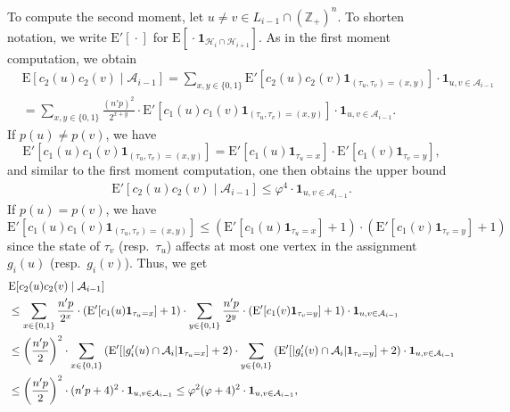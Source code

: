 \documentclass[11pt]{article}
\newcommand{\Z}{\mathbb{Z}}
\newcommand{\A}{\mathcal{A}}
\DeclarePairedDelimiter{\abs}{\lvert}{\rvert}
\theoremstyle{remark}
\begin{document}
    To compute the second moment, let $u\neq v \in L_{i-1} \cap (\Z_+)^n$. To shorten notation, we write $\mathrm E'[\ \boldsymbol{\cdot}\ ]$ for  $\mathrm E[\ \boldsymbol{\cdot}\ \mathbf{1}_{\mathcal{H}_i \cap \mathcal{H}_{i+1}} ]$.  As in the first moment computation, we obtain
    \begin{align}
        &\mathrm E[c_2(u) c_2(v) \mid \A_{i-1}] = \sum_{x,y\in \{0,1\}} \mathrm E'[c_2(u) c_2(v) \mathbf{1}_{(\tau_u,\tau_v)=(x,y)}  ] \cdot  \mathbf{1}_{u,v \in \A_{i-1}} \\
        &=  \sum_{x,y\in \{0,1\}} \frac{(n'p)^2}{2^{x+y}}\cdot \mathrm E'[c_1(u) c_1(v) \mathbf{1}_{(\tau_u,\tau_v)=(x,y)}   ] \cdot  \mathbf{1}_{u,v \in \A_{i-1}}.
    \end{align}
    If $p(u) \neq p(v)$, we have
    \begin{equation}
        \mathrm E'[c_1(u) c_1(v) \mathbf{1}_{(\tau_u,\tau_v)=(x,y)}] =  \mathrm E'[c_1(u) \mathbf{1}_{\tau_u=x}] \cdot \mathrm E'[c_1(v) \mathbf{1}_{\tau_v=y}],
    \end{equation}
    and similar to the first moment computation, one then obtains the upper bound  
    \begin{align}
        \mathrm E'[c_2(u) c_2(v) \mid \A_{i-1}] \le \varphi^4 \cdot  \mathbf{1}_{u,v \in \A_{i-1}}.
    \end{align}
    If $p(u) = p(v)$, we have 
    \begin{equation}
        \mathrm E'[c_1(u) c_1(v) \mathbf{1}_{(\tau_u,\tau_v)=(x,y)}] \le  (\mathrm E'[c_1(u) \mathbf{1}_{\tau_u=x}]+1) \cdot (\mathrm E'[c_1(v) \mathbf{1}_{\tau_v=y}]+1)
    \end{equation}
    since the state of $\tau_v$ (resp.\ $\tau_u$) affects at most one vertex in the assignment $g_i(u)$ (resp.\ $g_i(v)$). Thus, we get
    \begin{align}
        &\mathrm E[c_2(u) c_2(v) \mid \A_{i-1}] \\
        &\le  \sum_{x\in \{0,1\}} \frac{n'p}{2^{x}}\cdot  (\mathrm E'[c_1(u) \mathbf{1}_{\tau_u=x}]+1) \cdot \sum_{y\in \{0,1\}} \frac{n'p}{2^{y}} \cdot (\mathrm E'[c_1(v) \mathbf{1}_{\tau_v=y}]+1) \cdot\mathbf{1}_{u,v \in \A_{i-1}}  \\
         &\le \left(\frac{n'p}{2}\right)^2 \cdot  \sum_{x\in \{0,1\}}  \left(\mathrm E'[ \abs{g'_i(u) \cap \A_i} \mathbf{1}_{\tau_u=x}]+2\right)  \cdot  \sum_{y\in \{0,1\}}  \left(\mathrm E'[ \abs{g'_i(v) \cap \A_i} \mathbf{1}_{\tau_v=y}]+2 \right) \cdot \mathbf{1}_{u,v \in \A_{i-1}}  \\
         &\le \left(\frac{n'p}{2}\right)^2 \cdot  (n'p + 4)^2 \cdot \mathbf{1}_{u,v \in \A_{i-1}}  \le \varphi^2 (\varphi+4)^2\cdot \mathbf{1}_{u,v \in \A_{i-1}} ,
    \end{align}
\end{document}
